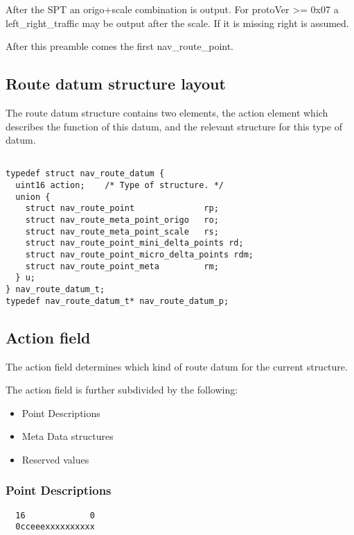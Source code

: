 \documentclass[a4paper]{article}
\begin{document}
After the SPT an origo+scale combination is output. For protoVer >= 0x07 
a left\_right\_traffic may be output after the scale. If it is missing 
right is assumed.

After this preamble comes the first nav\_route\_point.

\subsection{Route datum structure layout}

The route datum structure contains two elements,
the action element which describes the function
of this datum, and the relevant structure for this
type of datum.

\begin{verbatim}

typedef struct nav_route_datum {
  uint16 action;    /* Type of structure. */
  union {
    struct nav_route_point              rp;
    struct nav_route_meta_point_origo   ro;
    struct nav_route_meta_point_scale   rs;
    struct nav_route_point_mini_delta_points rd;
    struct nav_route_point_micro_delta_points rdm;
    struct nav_route_point_meta         rm;
  } u;
} nav_route_datum_t;
typedef nav_route_datum_t* nav_route_datum_p;

\end{verbatim}



\subsection{Action field}

The action field determines which kind of route datum for the
current structure.

The action field is further subdivided by the following:

\begin{itemize}
\item Point Descriptions
\item Meta Data structures
\item Reserved values
\end{itemize}

\subsubsection{Point Descriptions}


\begin{verbatim}
  16             0
  0cceeexxxxxxxxxx
\end{verbatim}
\end{document}
